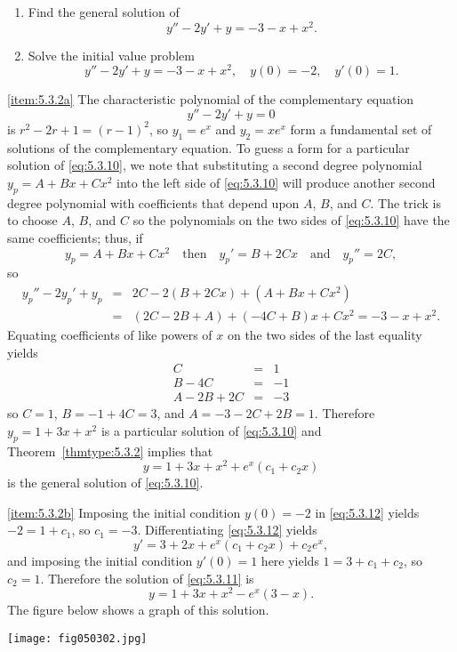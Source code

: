 \documentclass{ximera}
\begin{document}
\begin{example}\label{example:5.3.2}
\begin{enumerate}
\item \label{item:5.3.2a} %
Find the general solution of
\begin{equation} \label{eq:5.3.10}
y''-2y'+y=-3-x+x^2.
\end{equation}
\item \label{item:5.3.2b} %
Solve the initial value problem
\begin{equation} \label{eq:5.3.11}
y''-2y'+y=-3-x+x^2, \quad  y(0)=-2,\quad y'(0)=1.
\end{equation}
\end{enumerate}
 
\begin{explanation}
\ref{item:5.3.2a} The characteristic polynomial of the complementary equation
$$
y''-2y'+y=0
$$
is $r^2-2r+1=(r-1)^2$,
so $y_1=e^x$ and $y_2=xe^x$  form a fundamental set of solutions
of the complementary equation. To guess  a form for a particular
solution of \eqref{eq:5.3.10}, we note that substituting a second
degree polynomial $y_p=A+Bx+Cx^2$ into the left side of \eqref{eq:5.3.10}
will produce another second degree polynomial with coefficients that
depend upon $A$, $B$, and $C$. The trick is to choose $A$, $B$, and
$C$ so the polynomials on the two sides of \eqref{eq:5.3.10} have the
same coefficients;   thus,
if
$$
y_p=A+Bx+Cx^2\quad\mbox{then}\quad
y_p'=B+2Cx\quad\mbox{and}\quad y_p''=2C,
$$
so
\begin{eqnarray*}
y_p''-2y_p'+y_p&=&2C-2(B+2Cx)+(A+Bx+Cx^2)\\
&=&(2C-2B+A)+(-4C+B)x+Cx^2=-3-x+x^2.
\end{eqnarray*}
Equating  coefficients of like powers of $x$ on the two sides of the
last equality yields
\begin{eqnarray*}
C&=&1\\
B-4C&=&-1\\
A-2B+2C&=& -3
\end{eqnarray*}
so $C=1$, $B=-1+4C=3$, and $A=-3-2C+2B=1$.
Therefore $y_p=1+3x+x^2$ is a particular solution of
\eqref{eq:5.3.10} and  Theorem~\ref{thmtype:5.3.2} implies that
\begin{equation} \label{eq:5.3.12}
y=1+3x+x^2+e^x(c_1+c_2x)
\end{equation}
is the general solution of \eqref{eq:5.3.10}.
 
\ref{item:5.3.2b} Imposing the initial condition $y(0)=-2$ in
\eqref{eq:5.3.12} yields $-2=1+c_1$, so $c_1=-3$. Differentiating
\eqref{eq:5.3.12} yields
$$
y'=3+2x+e^x(c_1+c_2x)+c_2e^x,
$$
and imposing the initial condition $y'(0)=1$ here yields
$1=3+c_1+c_2$, so $c_2=1$. Therefore the solution of \eqref{eq:5.3.11}
is
$$
y=1+3x+x^2-e^x(3-x).
$$
The figure below shows a graph of this solution.
 
\begin{image}
  \texttt{[image: fig050302.jpg]}
\end{image}
 
\end{explanation}
\end{example}
 
\end{document}
